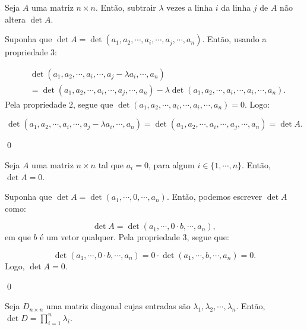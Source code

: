 \begin{Proposition}
	Seja $A$ uma matriz $n\times n$. Então, subtrair $\lambda$ vezes a linha $i$ da linha $j$ de $A$ não altera $\det A$. 
\end{Proposition}

\begin{Proof}
	Suponha que $\det A = \det(a_1, a_2, \cdots, a_i, \cdots, a_j, \cdots, a_n)$. Então, usando a propriedade $3$:
	
	\begin{align*}
		&\det(a_1, a_2, \cdots, a_i, \cdots, a_j - \lambda a_i, \cdots, a_n)\\ &= \det(a_1, a_2, \cdots, a_i, \cdots, a_j, \cdots, a_n) - \lambda\det(a_1, a_2, \cdots, a_i, \cdots, a_i, \cdots, a_n).
	\end{align*}
	Pela propriedade $2$, segue que $\det(a_1, a_2, \cdots, a_i, \cdots, a_i, \cdots, a_n) = 0$. Logo:
	
	$$
	\det(a_1, a_2, \cdots, a_i, \cdots, a_j - \lambda a_i, \cdots, a_n) = \det(a_1, a_2, \cdots, a_i, \cdots, a_j, \cdots, a_n) = \det A.
	$$
	
	\qed
\end{Proof}

\begin{Proposition}
	Seja $A$ uma matriz $n\times n$ tal que $a_i = 0$, para algum $i\in\{1, \cdots, n\}$. Então, $\det A = 0$.
\end{Proposition}

\begin{Proof}
	Suponha que $\det A = \det(a_1, \cdots, 0, \cdots, a_n)$. Então, podemos escrever $\det A$ como:
	
	$$
	\det A = \det(a_1, \cdots, 0\cdot b, \cdots, a_n),
	$$
	em que $b$ é um vetor qualquer. Pela propriedade $3$, segue que:
	
	$$
	\det(a_1, \cdots, 0\cdot b, \cdots, a_n) = 0\cdot\det(a_1, \cdots, b, \cdots, a_n) = 0.
	$$
	Logo, $\det A = 0$.
	
	\qed
\end{Proof}

\begin{Proposition}
	Seja $D_{n\times n}$ uma matriz diagonal cujas entradas são $\lambda_1, \lambda_2, \cdots, \lambda_n$. Então, $\det D = \prod\limits_{i = 1}^{n} \lambda_i$.
\end{Proposition}

